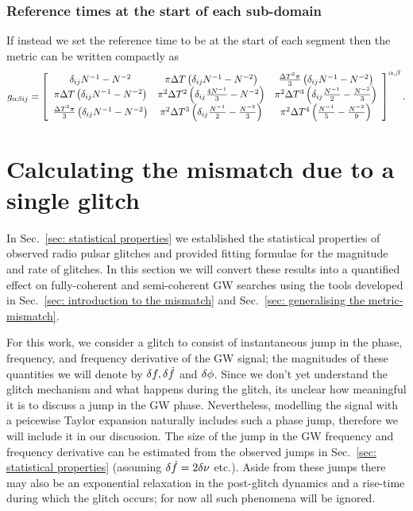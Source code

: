 \documentclass[../full_thesis/full_thesis.tex]{subfiles}
\begin{document}
\subsubsection{Reference times at the start of each sub-domain}
If instead we set the reference time to be at the start of each segment then the
metric can be written compactly as
\begin{equation}
g_{\alpha\beta ij}  =  \left[\begin{array}{ccc}
\delta_{ij}N^{-1}  -N^{-2}  &
\pi\Delta T \left( \delta_{ij}N^{-1} - N^{-2}\right)&
\frac{\Delta T^{2}\pi}{3} \left( \delta_{ij}N^{-1} - N^{-2}\right)\\
\pi\Delta T \left( \delta_{ij}N^{-1} - N^{-2}\right)&
\pi^{2}\Delta T^{2}\left(\delta_{ij}\frac{4N^{-1}}{3} - N^{-2}\right) &
\pi^{2}\Delta T^{3}\left(\delta_{ij}\frac{N^{-1}}{2} - \frac{N^{-2}}{3}\right) \\
\frac{\Delta T^{2}\pi}{3} \left( \delta_{ij}N^{-1} - N^{-2}\right) &
\pi^{2}\Delta T^{3}\left(\delta_{ij}\frac{N^{-1}}{2} - \frac{N^{-2}}{3}\right)  &
\pi^{2}\Delta T^{4}\left(\frac{N^{-1}}{5} - \frac{N^{-2}}{9}\right) \\
\end{array}
\right]^{\alpha, \beta}.
\label{eqn: metric equal segments tref 0}
\end{equation}

\section{Calculating the mismatch due to a single glitch}
\label{sec: mismatch due to glitches}

In Sec.~\ref{sec: statistical properties} we established the statistical
properties of observed radio pulsar glitches and provided fitting formulae for the
magnitude and rate of glitches. In this section we will convert these
results into a quantified effect on fully-coherent and semi-coherent
GW searches using the tools developed in Sec.~\ref{sec: introduction to the
mismatch} and Sec.~\ref{sec: generalising the metric-mismatch}.

For this work, we consider a glitch to consist of instantaneous jump in the
phase, frequency, and frequency derivative of the GW signal; the magnitudes of
these quantities we will denote by $\delta f, \delta\dot{f}$ and $\delta\phi$.
Since we don't yet understand the glitch mechanism and what happens during the
glitch, its unclear how meaningful it is to discuss a jump in the GW phase.
Nevertheless, modelling the signal with
a peicewise Taylor expansion naturally includes such a phase jump, therefore
we will include it in our discussion.
The size of the jump in the GW frequency and frequency derivative can be
estimated from the observed jumps in Sec.~\ref{sec: statistical properties}
(assuming $\delta\dot{f} = 2\delta\nu$ etc.). Aside from these jumps there may also
be an exponential relaxation in the post-glitch dynamics and a rise-time during
which the glitch occurs; for now all such phenomena will be ignored.
\end{document}
